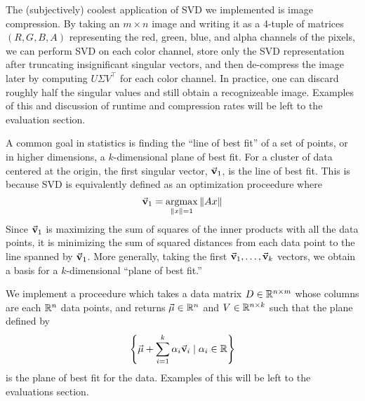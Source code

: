 The (subjectively) coolest application of SVD we implemented is image compression. By taking an $m \times n$ image and 
writing it as a 4-tuple of matrices $(R, G, B, A)$ representing the red, green, blue, and alpha channels of the pixels,
we can perform SVD on each color channel, store only the SVD representation after truncating insignificant singular
vectors, and then de-compress the image later by computing $U \Sigma V^\top$ for each color channel. In practice,
one can discard roughly half the singular values and still obtain a recognizeable image. Examples of this and discussion 
of runtime and compression rates will be left to the evaluation section.

A common goal in statistics is finding the ``line of best fit'' of a set of points, or in higher dimensions,
a $k$-dimensional plane of best fit. For a cluster of data centered at the origin, the first singular vector, $\vec{\mathbf{v}}_1$,
is the line of best fit. This is because SVD is equivalently defined as an optimization proceedure where 
\[
    \vec{\mathbf{v}}_1 = \operatorname*{argmax}_{\|x\| = 1} \|Ax\|
\]
Since $\vec{\mathbf{v}}_1$ is maximizing the sum of squares of the inner products with all the data points, it is minimizing 
the sum of squared distances from each data point to the line spanned by $\vec{\mathbf{v}}_1$. More generally, taking the first 
$\vec{\mathbf{v}}_1, \ldots, \vec{\mathbf{v}}_k$ vectors, we obtain a basis for a $k$-dimensional ``plane of best fit.'' 

We implement a proceedure which takes a data matrix $D \in \mathbb{R}^{n \times m}$ whose columns are each $\mathbb{R}^n$ data points, 
and returns $\vec{\mathbf{\mu}} \in \mathbb{R}^n$ and $V \in \mathbb{R}^{n \times k}$ such that the plane defined by 
\[
    \left\{\vec{\mathbf{\mu}} + \sum_{i = 1}^{k} \alpha_i \vec{\mathbf{v}}_i \mid \alpha_i \in \mathbb{R}\right\}
\]
is the plane of best fit for the data. Examples of this will be left to the evaluations section.